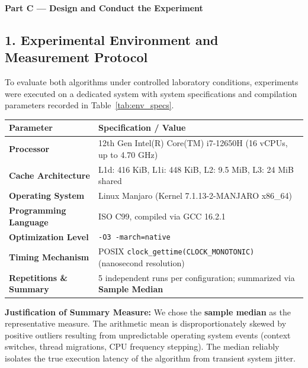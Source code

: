 \documentclass[11pt]{article}
\begin{document}
\newpage

{\centering\fontsize{15}{18}\selectfont\textbf{Part C --- Design and Conduct the Experiment}\par}
\vspace{0.8em}

\subsection*{1. Experimental Environment and Measurement Protocol}
To evaluate both algorithms under controlled laboratory conditions, experiments were executed on a dedicated system with system specifications and compilation parameters recorded in Table~\ref{tab:env_specs}.

\begin{center}
\small
{}
\label{tab:env_specs}
\vspace{-0.4em}
\begin{tabularx}{0.95\textwidth}{l X}
\toprule
\textbf{Parameter} & \textbf{Specification / Value} \\
\midrule
\textbf{Processor} & 12th Gen Intel(R) Core(TM) i7-12650H (16 vCPUs, up to 4.70 GHz) \\
\textbf{Cache Architecture} & L1d: 416 KiB, L1i: 448 KiB, L2: 9.5 MiB, L3: 24 MiB shared \\
\textbf{Operating System} & Linux Manjaro (Kernel 7.1.13-2-MANJARO x86\_64) \\
\textbf{Programming Language} & ISO C99, compiled via GCC 16.2.1 \\
\textbf{Optimization Level} & \texttt{-O3 -march=native} \\
\textbf{Timing Mechanism} & POSIX \texttt{clock\_gettime(CLOCK\_MONOTONIC)} (nanosecond resolution) \\
\textbf{Repetitions \& Summary} & 5 independent runs per configuration; summarized via \textbf{Sample Median} \\
\bottomrule
\end{tabularx}
\end{center}

\noindent\textbf{Justification of Summary Measure:} We chose the \textbf{sample median} as the representative measure. The arithmetic mean is disproportionately skewed by positive outliers resulting from unpredictable operating system events (context switches, thread migrations, CPU frequency stepping). The median reliably isolates the true execution latency of the algorithm from transient system jitter.
\end{document}
